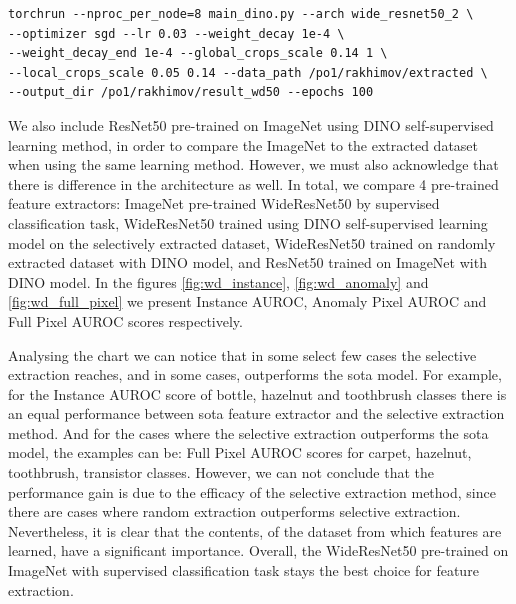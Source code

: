 \begin{lstlisting}
torchrun --nproc_per_node=8 main_dino.py --arch wide_resnet50_2 \ 
--optimizer sgd --lr 0.03 --weight_decay 1e-4 \ 
--weight_decay_end 1e-4 --global_crops_scale 0.14 1 \ 
--local_crops_scale 0.05 0.14 --data_path /po1/rakhimov/extracted \ 
--output_dir /po1/rakhimov/result_wd50 --epochs 100
\end{lstlisting}

We also include ResNet50 pre-trained on ImageNet using DINO self-supervised learning method, in order to compare the ImageNet to the extracted dataset when using the same learning method. However, we must also acknowledge that there is difference in the architecture as well. In total, we compare 4 pre-trained feature extractors: ImageNet pre-trained WideResNet50 by supervised classification task, WideResNet50 trained using DINO self-supervised learning model on the selectively extracted dataset, WideResNet50 trained on randomly extracted dataset with DINO model, and ResNet50 trained on ImageNet with DINO model. In the figures \ref{fig:wd_instance}, \ref{fig:wd_anomaly} and \ref{fig:wd_full_pixel} we present Instance AUROC, Anomaly Pixel AUROC and Full Pixel AUROC scores respectively.

Analysing the chart we can notice that in some select few cases the selective extraction reaches, and in some cases, outperforms the sota model. For example, for the Instance AUROC score of bottle, hazelnut and toothbrush classes there is an equal performance between sota feature extractor and the selective extraction method. And for the cases where the selective extraction outperforms the sota model, the examples can be: Full Pixel AUROC scores for carpet, hazelnut, toothbrush, transistor classes. However, we can not conclude that the performance gain is due to the efficacy of the selective extraction method, since there are cases where random extraction outperforms selective extraction. Nevertheless, it is clear that the contents, of the dataset from which features are learned, have a significant importance. Overall, the WideResNet50 pre-trained on ImageNet with supervised classification task stays the best choice for feature extraction.

